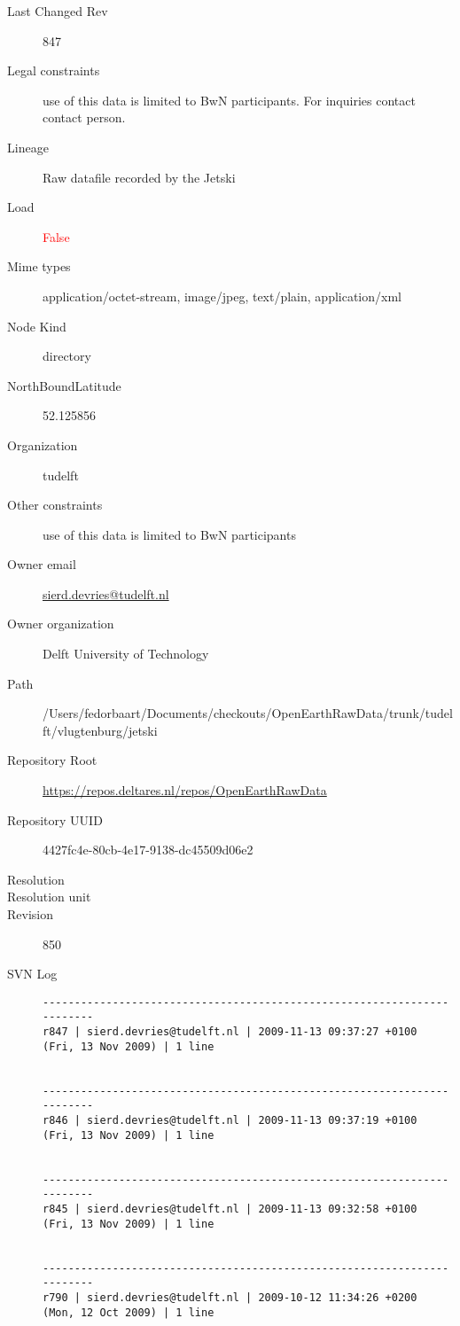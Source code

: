 \documentclass[9]{report}
\begin{document}
\begin{description}
  \item[Last Changed Rev] 847
  \item[Legal constraints] use of this data is limited to BwN participants. For inquiries contact contact person.
  \item[Lineage] Raw datafile recorded by the Jetski
  \item[Load] \textcolor{red}{False}
  \item[Mime types] application/octet-stream, image/jpeg, text/plain, application/xml
  \item[Node Kind] directory
  \item[NorthBoundLatitude] 52.125856
  \item[Organization] tudelft
  \item[Other constraints] use of this data is limited to BwN participants
  \item[Owner email] \href{mailto:sierd.devries@tudelft.nl}{sierd.devries@tudelft.nl}
  \item[Owner organization] Delft University of Technology
  \item[Path] /Users/fedorbaart/Documents/checkouts/OpenEarthRawData/trunk/tudelft/vlugtenburg/jetski
  \item[Repository Root] \href{https://repos.deltares.nl/repos/OpenEarthRawData}{https://repos.deltares.nl/repos/OpenEarthRawData}
  \item[Repository UUID] 4427fc4e-80cb-4e17-9138-dc45509d06e2
  \item[Resolution] 
  \item[Resolution unit] 
  \item[Revision] 850
  \item[SVN Log] \begin{verbatim}
------------------------------------------------------------------------
r847 | sierd.devries@tudelft.nl | 2009-11-13 09:37:27 +0100 (Fri, 13 Nov 2009) | 1 line


------------------------------------------------------------------------
r846 | sierd.devries@tudelft.nl | 2009-11-13 09:37:19 +0100 (Fri, 13 Nov 2009) | 1 line


------------------------------------------------------------------------
r845 | sierd.devries@tudelft.nl | 2009-11-13 09:32:58 +0100 (Fri, 13 Nov 2009) | 1 line


------------------------------------------------------------------------
r790 | sierd.devries@tudelft.nl | 2009-10-12 11:34:26 +0200 (Mon, 12 Oct 2009) | 1 line


\end{verbatim}
\end{description}
\end{document}
